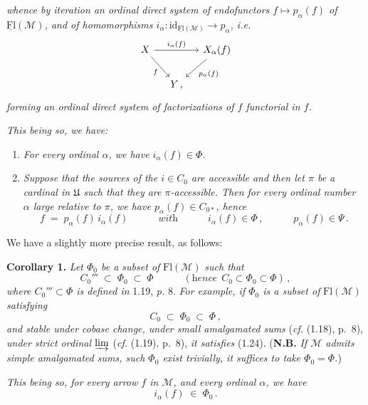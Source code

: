 \documentclass[11pt]{article}
\newcommand{\printedpage}[1]{\marginpar{\footnotesize p.~#1}}
\newcommand{\msp}[1]{\marginpar{\footnotesize [#1]}}
\newcommand{\uFl}{\underline{\mathrm{Fl}}}
\newcommand{\Fl}{\mathrm{Fl}}
\newcommand{\cM}{\mathcal{M}}
\begin{document}
\printedpage{9}

{\itshape whence by iteration an ordinal direct system of endofunctors $f\longmapsto p_\alpha(f)$ of $\uFl(\cM)$, and of homomorphisms $i_\alpha : \mathrm{id}_{\uFl(\cM)} \longrightarrow p_\alpha$, \textup{i.e.}}
\[
\begin{tikzcd}[column sep=small]
X \arrow[rr, "i_\alpha(f)"] \arrow[dr, "f"'] & & X_\alpha(f) \arrow[dl, "p_\alpha(f)"] \\
& Y\,, &
\end{tikzcd}
\]
{\itshape forming an ordinal direct system of factorizations of $f$ functorial in $f$.}

\msp{page 11}

{\itshape This being so, we have:}
\begin{enumerate}[label={}, leftmargin=*]
\item[a)] {\itshape For every ordinal $\alpha$, we have $i_\alpha(f)\in\Phi$.}
\item[b)] {\itshape Suppose that the sources of the $i\in C_0$ are accessible and then let $\pi$ be a cardinal in $\mathfrak{U}$ such that they are $\pi$-accessible. Then for every ordinal number $\alpha$ large relative to $\pi$, we have $p_\alpha(f)\in C_{0*}$, hence}
\[
f \;=\; p_\alpha(f)\, i_\alpha(f) \qquad\quad \textit{with} \qquad\quad i_\alpha(f)\in\Phi\,, \qquad\quad p_\alpha(f)\in\Psi\,.
\]
\end{enumerate}

We have a slightly more precise result, as follows:

\textbf{Corollary 1.} \textit{Let $\Phi_0$ be a subset of} $\Fl(\cM)$ \textit{such that}
\[
C_0''' \;\subset\; \Phi_0 \;\subset\; \Phi \qquad\quad (\textit{hence}\ \ C_0\subset\Phi_0\subset\Phi)\,,
\tag*{(1.24)}
\]
\textit{where $C_0'''\subset\Phi$ is defined in} 1.19, \textit{p.} 8. \textit{For example, if $\Phi_0$ is a subset of} $\Fl(\cM)$ \textit{satisfying}
\[
C_0 \;\subset\; \Phi_0 \;\subset\; \Phi\,,
\]
\textit{and stable under cobase change, under small amalgamated sums} (\textit{cf.} (1.18), p.~8), \textit{under strict ordinal $\varinjlim$} (\textit{cf.} (1.19), p.~8), \textit{it satisfies} (1.24). (\textbf{N.B.} \textit{If $\cM$ admits simple amalgamated sums, such $\Phi_0$ exist trivially, it suffices to take $\Phi_0=\Phi$.})

\msp{page 12}

\textit{This being so, for every arrow $f$ in $\cM$, and every ordinal $\alpha$, we have}
\[
i_\alpha(f) \;\in\; \Phi_0\,.
\]
\end{document}

